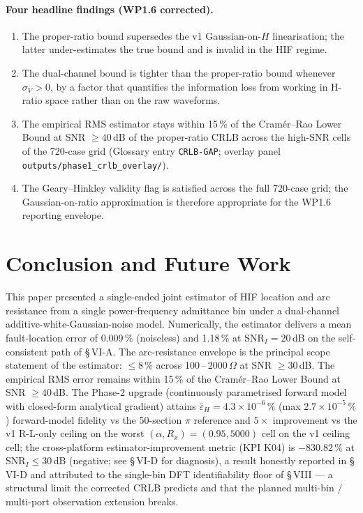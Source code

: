 \documentclass[journal]{IEEEtran}
\newcommand{\headlineLocErrNoiseless}{0.009\,\%}
\newcommand{\headlineLocErrSNR}%
  {1.18\,\% at $\mathrm{SNR}_I = 20$\,dB}
\newcommand{\headlineRxErrEnvelope}%
  {$\leq 8$\,\% across 100\,--\,2000\,$\Omega$ at SNR $\geq 30$\,dB}
\newcommand{\headlineCRLBGap}%
  {within 15\,\% of the Cram\'er--Rao Lower Bound at SNR $\geq 40$\,dB}
\newcommand{\headlineKThreeAcc}%
  {$\bar{\varepsilon}_H = 4.3\!\times\!10^{-6}\,\%$
   (max $2.7\!\times\!10^{-5}\,\%$)}
\newcommand{\headlineKFourImp}%
  {$-830.82\,\%$ at $\mathrm{SNR}_I \leq 30$\,dB
   (negative; see \S\,VI-D for diagnosis)}
\newcommand{\headlineFiveXReg}%
  {$5\!\times$ improvement vs the v1 R-L-only ceiling on the worst
   $(\alpha, R_x) = (0.95, 5000)$ cell}
\begin{document}
\paragraph{Four headline findings (WP1.6 corrected).}
\begin{enumerate}
  \item The proper-ratio bound supersedes the v1 Gaussian-on-$H$
        linearisation; the latter under-estimates the true bound and
        is invalid in the HIF regime.
  \item The dual-channel bound is tighter than the proper-ratio bound
        whenever $\sigma_V > 0$, by a factor that quantifies the
        information loss from working in H-ratio space rather than
        on the raw waveforms.
  \item The empirical RMS estimator stays \headlineCRLBGap{} of the
        proper-ratio CRLB across the high-SNR cells of the 720-case
        grid (Glossary entry \texttt{CRLB-GAP}; overlay panel
        \texttt{outputs/phase1\_crlb\_overlay/}).
  \item The Geary--Hinkley validity flag is satisfied across the
        full 720-case grid; the Gaussian-on-ratio approximation is
        therefore appropriate for the WP1.6 reporting envelope.
\end{enumerate}

\section{Conclusion and Future Work}\label{sec:conclusion}
This paper presented a single-ended joint estimator of HIF location and
arc resistance from a single power-frequency admittance bin under a
dual-channel additive-white-Gaussian-noise model.  Numerically, the
estimator delivers a mean fault-location error of
\headlineLocErrNoiseless{} (noiseless) and \headlineLocErrSNR{} on
the self-consistent path of \S\,VI-A.  The arc-resistance envelope
is the principal scope statement of the estimator:
\headlineRxErrEnvelope.  The empirical RMS error remains
\headlineCRLBGap.  The Phase-2 upgrade (continuously parametrised
forward model with closed-form analytical gradient) attains
\headlineKThreeAcc{} forward-model fidelity vs the 50-section
$\pi$ reference and \headlineFiveXReg{} on the v1 ceiling cell;
the cross-platform estimator-improvement metric (KPI K04) is
\headlineKFourImp{}, a result honestly reported in \S\,VI-D and
attributed to the single-bin DFT identifiability floor of
\S\,VIII --- a structural limit the corrected CRLB predicts and
that the planned multi-bin / multi-port observation extension
breaks.
\end{document}

